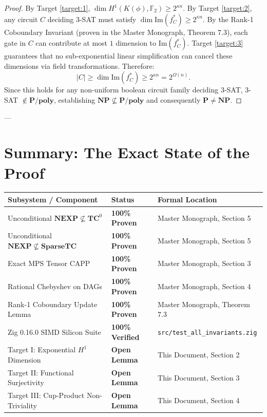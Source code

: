 \documentclass[11pt,a4paper]{article}
\theoremstyle{plain}
\theoremstyle{definition}
\theoremstyle{remark}
\newcommand{\NEXP}{\mathbf{NEXP}}
\newcommand{\TC}{\mathbf{TC}}
\newcommand{\SparseTC}{\mathbf{SparseTC}}
\newcommand{\Img}{\mathrm{Im}}
\begin{document}
\begin{proof}
By Target \ref{target:1}, $\dim H^1(K(\phi), \mathbb{F}_2) \ge 2^{\kappa n}$.
By Target \ref{target:2}, any circuit $C$ deciding 3-SAT must satisfy $\dim \Img(f_C^*) \ge 2^{\kappa n}$.
By the Rank-1 Coboundary Invariant (proven in the Master Monograph, Theorem 7.3), each gate in $C$ can contribute at most $1$ dimension to $\Img(f_C^*)$.
Target \ref{target:3} guarantees that no sub-exponential linear simplification can cancel these dimensions via field transformations.
Therefore:
\[
|C| \ge \dim \Img(f_C^*) \ge 2^{\kappa n} = 2^{\Omega(n)}.
\]
Since this holds for any non-uniform boolean circuit family deciding 3-SAT, 3-SAT $\notin \mathbf{P/poly}$, establishing $\mathbf{NP} \not\subseteq \mathbf{P/poly}$ and consequently $\mathbf{P} \neq \mathbf{NP}$.
\end{proof}

---

\section{Summary: The Exact State of the Proof}

\begin{center}
\begin{tabular}{lll}
\toprule
\textbf{Subsystem / Component} & \textbf{Status} & \textbf{Formal Location} \\
\midrule
Unconditional $\NEXP \not\subseteq \TC^0$ & \textbf{100\% Proven} & Master Monograph, Section 5 \\
Unconditional $\NEXP \not\subseteq \SparseTC$ & \textbf{100\% Proven} & Master Monograph, Section 5 \\
Exact MPS Tensor CAPP & \textbf{100\% Proven} & Master Monograph, Section 3 \\
Rational Chebyshev on DAGs & \textbf{100\% Proven} & Master Monograph, Section 4 \\
Rank-1 Coboundary Update Lemma & \textbf{100\% Proven} & Master Monograph, Theorem 7.3 \\
Zig 0.16.0 SIMD Silicon Suite & \textbf{100\% Verified} & \texttt{src/test\_all\_invariants.zig} \\
\midrule
Target I: Exponential $H^1$ Dimension & \textbf{Open Lemma} & This Document, Section 2 \\
Target II: Functional Surjectivity & \textbf{Open Lemma} & This Document, Section 3 \\
Target III: Cup-Product Non-Triviality & \textbf{Open Lemma} & This Document, Section 4 \\
\bottomrule
\end{tabular}
\end{center}
\end{document}
